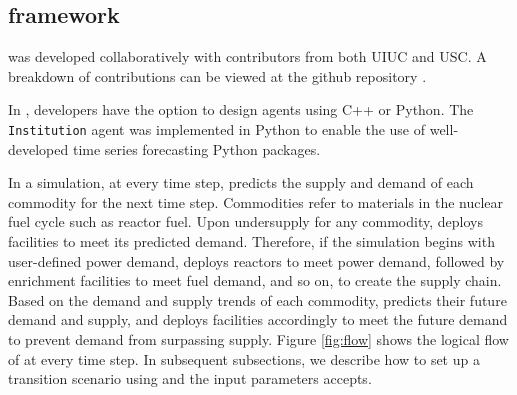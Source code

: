 \subsection{\deploy framework}
\label{sec:d3ploy}

\deploy was developed collaboratively with contributors from 
both \gls{UIUC} and \gls{USC}. 
A breakdown of contributions can be viewed at the \deploy 
github repository \cite{noauthor_arfc/d3ploy:_2019}.  

In \Cyclus, developers have the option to design 
agents using C++ or Python. 
The \deploy \texttt{Institution} agent was 
implemented in Python to enable the use of 
well-developed time series forecasting Python packages. 

In a \Cyclus simulation, at every time step, \deploy 
predicts the supply and demand of each commodity for the next time 
step. 
Commodities refer to materials in the nuclear fuel cycle such as 
reactor fuel. 
Upon undersupply for any commodity, 
\deploy deploys facilities to meet its predicted demand.
Therefore, if the simulation begins with user-defined power 
demand, \deploy deploys reactors to meet power demand, 
followed by enrichment facilities to meet fuel demand, and so on,
to create the supply chain.
Based on the demand and supply trends of each commodity, 
\deploy predicts their 
future demand and supply, and deploys facilities 
accordingly to meet the future demand to prevent demand 
from surpassing supply. 
Figure \ref{fig:flow} shows the logical flow of \deploy 
at every time step. 
In subsequent subsections, we describe how to set up a 
transition scenario using \deploy and the input parameters 
\deploy accepts. 

